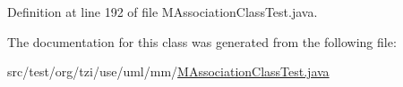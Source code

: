Definition at line 192 of file M\-Association\-Class\-Test.\-java.



The documentation for this class was generated from the following file\-:\begin{DoxyCompactItemize}
\item 
src/test/org/tzi/use/uml/mm/\hyperlink{_m_association_class_test_8java}{M\-Association\-Class\-Test.\-java}\end{DoxyCompactItemize}
